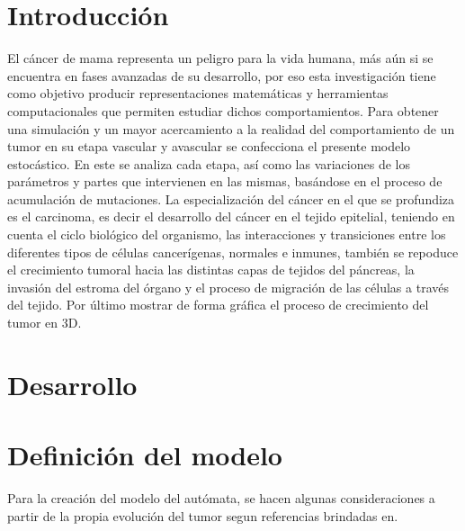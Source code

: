 \documentclass[12pt]{amsart}
\begin{document}
\section{Introducci\'on}
El c\'ancer de mama representa un peligro para la vida humana, m\'as a\'un si se encuentra en fases avanzadas de su desarrollo, por eso esta investigaci\'on tiene como objetivo producir representaciones matem\'aticas y herramientas computacionales que permiten estudiar dichos comportamientos. Para obtener una simulaci\'on y un mayor acercamiento a la realidad del comportamiento de un tumor en su etapa vascular y avascular se confecciona el presente modelo estoc\'astico. En este se analiza cada etapa, as\'i como las variaciones de los par\'ametros y partes que intervienen en las mismas, bas\'andose en el proceso de acumulaci\'on de mutaciones. La especializaci\'on del c\'ancer en el que se profundiza es el carcinoma, es decir el desarrollo del c\'ancer en el tejido epitelial, teniendo
en cuenta el ciclo biol\'ogico del organismo, las interacciones y transiciones entre los diferentes tipos de c\'elulas cancer\'igenas, normales e inmunes, tambi\'en se repoduce el crecimiento tumoral hacia las distintas capas de tejidos del p\'ancreas, la invasi\'on del estroma del \'organo y el proceso de migraci\'on de las c\'elulas a trav\'es del tejido. Por \'ultimo mostrar de forma gr\'afica el proceso de crecimiento del tumor en 3D.

\newpage
\section{\bf{Desarrollo}}

\section{\bf{Definici\'on del modelo}}
Para la creaci\'on del modelo del aut\'omata, se hacen algunas consideraciones a partir de la propia evoluci\'on del tumor segun referencias brindadas en\cite{1}.
\end{document}
